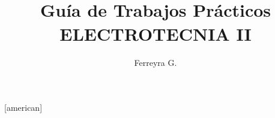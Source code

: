 \usepackage[utf8]{inputenc}
\usepackage[spanish]{babel}
\usepackage{circuitikz}[american]
\usepackage{amsmath,pgfplots,newtxtext,newtxmath,steinmetz}
\usepackage{sectsty,longtable,enumitem,tikz,subfiles,rotating}
\usepackage[toc]{glossaries}
\usepackage{subfiles}
\usepackage[]{toolsgf}
\usepackage{titletoc}
\usepackage{sectsty}
\usepackage{fancyhdr,geometry}
\usepackage{pdfpages}
\usepackage{titlesec}
\usepackage{cancel}

    \sectionfont{\sffamily\Large}
    \subsectionfont{\sffamily}

\pgfplotsset{compat=1.7}

\newcommand{\materia}{ELECTROTECNIA II}
\newcommand{\TP}{}
\newcommand{\logo}{images/logos/4124}
\newcommand{\email}{gustavoferreyra@outlook.com}
\newcommand{\classroomcode}{.......}
\newcommand{\urlqr}{https://es.scribd.com/document/528527875/}
\title{ \logoo \\ \Huge Guía de Trabajos Prácticos\\  \textbf{\materia}}
\author{Ferreyra G.}
\date{}
\sectionfont{\sffamily}
\subsectionfont{\sffamily}


